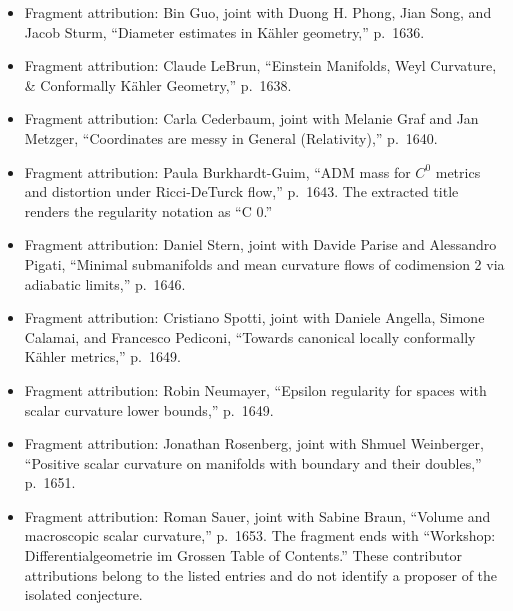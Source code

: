 \documentclass[11pt]{article}
\begin{document}
\begin{itemize}
\item Fragment attribution: Bin Guo, joint with Duong H. Phong, Jian Song, and Jacob Sturm, ``Diameter estimates in Kähler geometry,'' p.\ 1636.
\item Fragment attribution: Claude LeBrun, ``Einstein Manifolds, Weyl Curvature, \& Conformally Kähler Geometry,'' p.\ 1638.
\item Fragment attribution: Carla Cederbaum, joint with Melanie Graf and Jan Metzger, ``Coordinates are messy in General (Relativity),'' p.\ 1640.
\item Fragment attribution: Paula Burkhardt-Guim, ``ADM mass for \(C^0\) metrics and distortion under Ricci-DeTurck flow,'' p.\ 1643. The extracted title renders the regularity notation as ``C 0.''
\item Fragment attribution: Daniel Stern, joint with Davide Parise and Alessandro Pigati, ``Minimal submanifolds and mean curvature flows of codimension 2 via adiabatic limits,'' p.\ 1646.
\item Fragment attribution: Cristiano Spotti, joint with Daniele Angella, Simone Calamai, and Francesco Pediconi, ``Towards canonical locally conformally Kähler metrics,'' p.\ 1649.
\item Fragment attribution: Robin Neumayer, ``Epsilon regularity for spaces with scalar curvature lower bounds,'' p.\ 1649.
\item Fragment attribution: Jonathan Rosenberg, joint with Shmuel Weinberger, ``Positive scalar curvature on manifolds with boundary and their doubles,'' p.\ 1651.
\item Fragment attribution: Roman Sauer, joint with Sabine Braun, ``Volume and macroscopic scalar curvature,'' p.\ 1653. The fragment ends with ``Workshop: Differentialgeometrie im Grossen Table of Contents.'' These contributor attributions belong to the listed entries and do not identify a proposer of the isolated conjecture.
\end{itemize}
\end{document}
